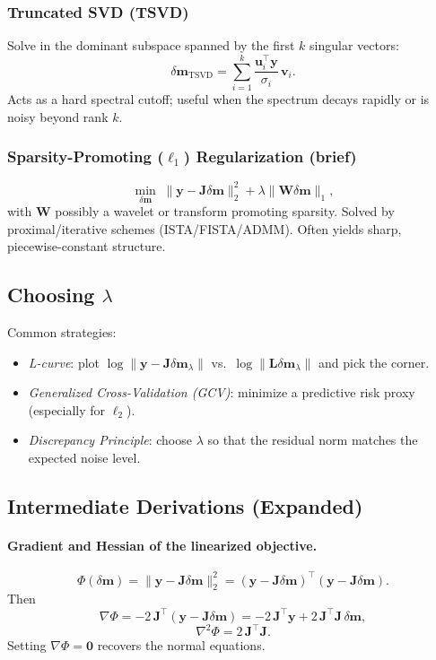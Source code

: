 \documentclass[11pt,a4paper]{article}
\begin{document}
\subsubsection{Truncated SVD (TSVD)}
Solve in the dominant subspace spanned by the first $k$ singular vectors:
\[
\delta\mathbf{m}_{\text{TSVD}} = \sum_{i=1}^{k} \frac{\mathbf{u}_i^\top \mathbf{y}}{\sigma_i}\,\mathbf{v}_i.
\]
Acts as a hard spectral cutoff; useful when the spectrum decays rapidly or is noisy beyond rank $k$.

\subsubsection{Sparsity-Promoting ($\ell_1$) Regularization (brief)}
\[
\min_{\delta\mathbf{m}} \; \|\mathbf{y}-\mathbf{J}\delta\mathbf{m}\|_2^2 + \lambda \|\mathbf{W}\delta\mathbf{m}\|_1,
\]
with $\mathbf{W}$ possibly a wavelet or transform promoting sparsity. Solved by proximal/iterative schemes (ISTA/FISTA/ADMM). Often yields sharp, piecewise-constant structure.

\subsection{Choosing \texorpdfstring{$\lambda$}{lambda}}
Common strategies:
\begin{itemize}
  \item \emph{L-curve}: plot $\log \|\mathbf{y}-\mathbf{J}\delta\mathbf{m}_\lambda\|$ vs.\ $\log \|\mathbf{L}\delta\mathbf{m}_\lambda\|$ and pick the corner.
  \item \emph{Generalized Cross-Validation (GCV)}: minimize a predictive risk proxy (especially for $\ell_2$).
  \item \emph{Discrepancy Principle}: choose $\lambda$ so that the residual norm matches the expected noise level.
\end{itemize}

\subsection{Intermediate Derivations (Expanded)}
\paragraph{Gradient and Hessian of the linearized objective.}
\[
\Phi(\delta\mathbf{m}) = \|\mathbf{y}-\mathbf{J}\delta\mathbf{m}\|_2^2
= (\mathbf{y}-\mathbf{J}\delta\mathbf{m})^\top(\mathbf{y}-\mathbf{J}\delta\mathbf{m}).
\]
Then
\[
\nabla \Phi = -2\,\mathbf{J}^\top (\mathbf{y}-\mathbf{J}\delta\mathbf{m}) 
= -2\,\mathbf{J}^\top \mathbf{y} + 2\,\mathbf{J}^\top\mathbf{J}\,\delta\mathbf{m},
\]
\[
\nabla^2 \Phi = 2\,\mathbf{J}^\top \mathbf{J}.
\]
Setting $\nabla\Phi=\mathbf{0}$ recovers the normal equations.
\end{document}
